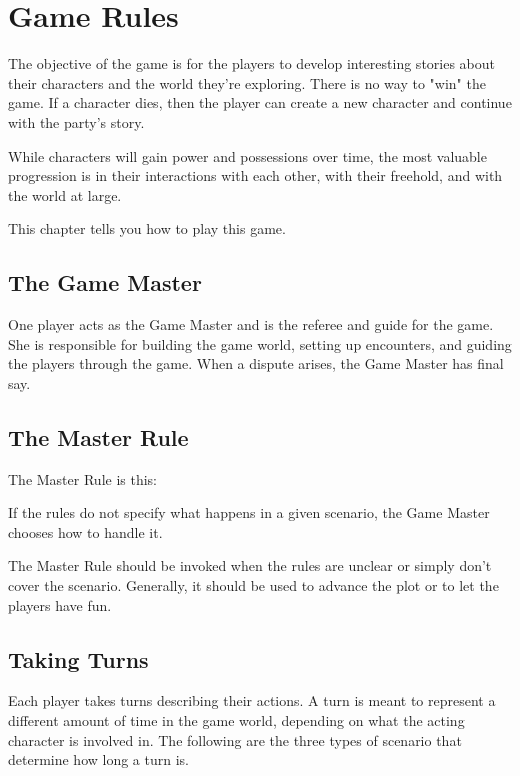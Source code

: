 \chapter{Game Rules}

\begin{multicols}{2}

The objective of the game is for the players to develop interesting
stories about their characters and the world they're exploring. There
is no way to "win" the game. If a character dies, then the player can
create a new character and continue with the party's story.

While characters will gain power and possessions over time, the most
valuable progression is in their interactions with each other, with
their freehold, and with the world at large.

This chapter tells you how to play this game.

\section{The Game Master}

One player acts as the Game Master and is the referee and guide for
the game. She is responsible for building the game world, setting up
encounters, and guiding the players through the game. When a dispute
arises, the Game Master has final say.

\section{The Master Rule}

The Master Rule is this:

\begin{displayquote}
If the rules do not specify what happens in a given scenario,
the Game Master chooses how to handle it.
\end{displayquote}

The Master Rule should be invoked when the rules are unclear or simply
don't cover the scenario. Generally, it should be used to advance the
plot or to let the players have fun.

\section{Taking Turns}

Each player takes turns describing their actions. A turn is meant to
represent a different amount of time in the game world, depending on
what the acting character is involved in. The following are the three
types of scenario that determine how long a turn is.


\end{multicols}
